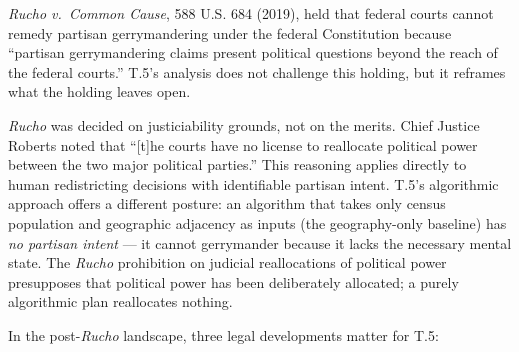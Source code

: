 \emph{Rucho v.\ Common Cause}, 588 U.S. 684 (2019), held that federal courts
cannot remedy partisan gerrymandering under the federal Constitution because
``partisan gerrymandering claims present political questions beyond the reach
of the federal courts.''
T.5's analysis does not challenge this holding, but it reframes what the
holding leaves open.

\emph{Rucho} was decided on justiciability grounds, not on the merits.
Chief Justice Roberts noted that ``[t]he courts have no license to reallocate
political power between the two major political parties.''
This reasoning applies directly to human redistricting decisions with
identifiable partisan intent.
T.5's algorithmic approach offers a different posture: an algorithm that
takes only census population and geographic adjacency as inputs (the
geography-only baseline) has \emph{no partisan intent} --- it cannot
gerrymander because it lacks the necessary mental state.
The \emph{Rucho} prohibition on judicial reallocations of political power
presupposes that political power has been deliberately allocated;
a purely algorithmic plan reallocates nothing.

In the post-\emph{Rucho} landscape, three legal developments matter for T.5:

